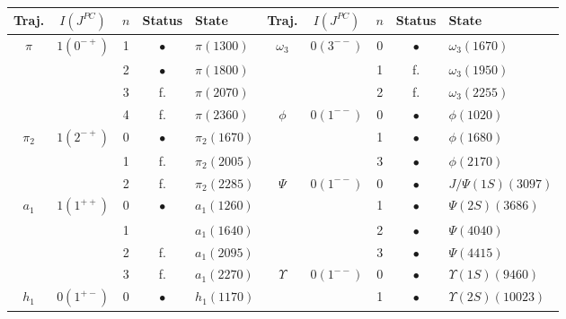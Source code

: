 \documentclass[11pt,a4]{article}
\begin{document}
\begin{table}[t!] \centering
	\begin{tabular}{|c|c|c|c|l|c|c|c|c|l|} \hline
		Traj. & \(I(J^{PC})\) & \(n\) & Status & State & Traj. & \(I(J^{PC})\) & \(n\) & Status & State \\ \hline
		
		\(\pi\) & \(1(0^{-+})\) &1 & \(\bullet\) & \(\pi(1300)\) 			     &	\(\omega_3\) &\(0(3^{--})\) &	0 & \(\bullet\) & \(\omega_3(1670)\)  \\

		          & &2 & \(\bullet\) & \(\pi(1800)\)				            					&&		& 1 & f. & \(\omega_3(1950)\) \\

		          & &3 & f. & \(\pi(2070)\)  				   										&&& 2 & f. & \(\omega_3(2255)\) \\ \cline{6-10}

							& &4 & f. & \(\pi(2360)\)				            & \(\phi\)	&	\(0(1^{--})\)	& 0 & \(\bullet\) & \(\phi(1020)\) \\ \cline{1-5}

		\(\pi_2\)& \(1(2^{-+})\) & 0 & \(\bullet\) & \(\pi_2(1670)\)  &	&			& 1 & \(\bullet\) & \(\phi(1680)\) \\

							& &1 & f. & \(\pi_2(2005)\) 		   & && 3 & \(\bullet\) & \(\phi(2170)\) \\ \cline{6-10}

							& &2 & f. &\(\pi_2(2285)\) &				          \(\Psi\)&	\(0(1^{--})\) & 0 & \(\bullet\) & \(J/\Psi(1S)(3097)\) \\ \cline{1-5}

		\(a_1\) & \(1(1^{++})\) &0 & \(\bullet\) & \(a_1(1260)\) & 			            &	& 1 & \(\bullet\) & \(\Psi(2S)(3686)\) \\

							& &1 & & \(a_1(1640)\) &				       && 2 & \(\bullet\) & \(\Psi(4040)\) \\

							& &2 & f. & \(a_1(2095)\) &				            &	& 3 & \(\bullet\)  & \(\Psi(4415)\) \\ \cline{6-10}

							& &3 & f. & \(a_1(2270)\) &	          \(\Upsilon\) & \(0(1^{--})\)& 0 & \(\bullet\) & \(\Upsilon(1S)(9460)\) \\ \cline{1-5}

		\(h_1\)		& \(0(1^{+-})\) & 0 & \(\bullet\) & \(h_1(1170)\) &				  & & 1 & \(\bullet\) & \(\Upsilon(2S)(10023)\) \\


\end{tabular}
\end{table}
\end{document}
